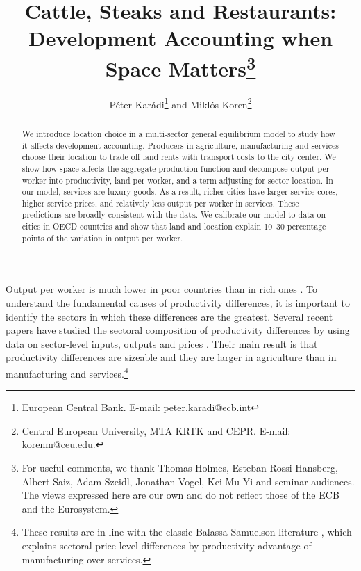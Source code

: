 \documentclass[12pt]{article}
\begin{document}
\title{Cattle, Steaks and Restaurants:\\ Development Accounting when Space Matters\thanks{For useful comments, we thank Thomas Holmes, Esteban Rossi-Hansberg, Albert Saiz, Adam Szeidl, Jonathan Vogel, Kei-Mu Yi and seminar audiences. The views expressed here are our own and do not reflect those of the ECB and the Eurosystem.}}
\author{Péter Karádi\thanks{European Central Bank. E-mail: peter.karadi@ecb.int} and Miklós Koren\thanks{Central European University, MTA KRTK and CEPR. E-mail: korenm@ceu.edu.}}
\maketitle

\begin{abstract}
We introduce location choice in a multi-sector general equilibrium model to study how it affects development accounting. Producers in agriculture, manufacturing and services choose their location to trade off land rents with transport costs to the city center. We show how space affects the aggregate production function and decompose output per worker into productivity, land per worker, and a term adjusting for sector location. In our model, services are luxury goods. As a result, richer cities have larger service cores, higher service prices, and relatively less output per worker in services. These predictions are broadly consistent with the data. We calibrate our model to data on cities in OECD countries and show that land and location explain 10--30 percentage points of the variation in output per worker.
\end{abstract}

Output per worker is much lower in poor countries than in rich ones \cite{Klenow97,Hall99,Caselli05}. To understand the fundamental causes of productivity differences, it is important to identify the sectors in which these differences are the greatest. Several recent papers have studied the sectoral composition of productivity differences by using data on sector-level inputs, outputs and prices \cite{Bailey01,Caselli05,Restuccia08,Duarte10,Duarte2015-gl}. Their main result is that productivity differences are sizeable and they are larger in agriculture than in manufacturing and services.\footnote{These results are in line with the classic Balassa-Samuelson literature \cite{Balassa64,Samuelson64,Baumol65,Baumol67}, which explains sectoral price-level differences by productivity advantage of manufacturing over services.}
\end{document}
